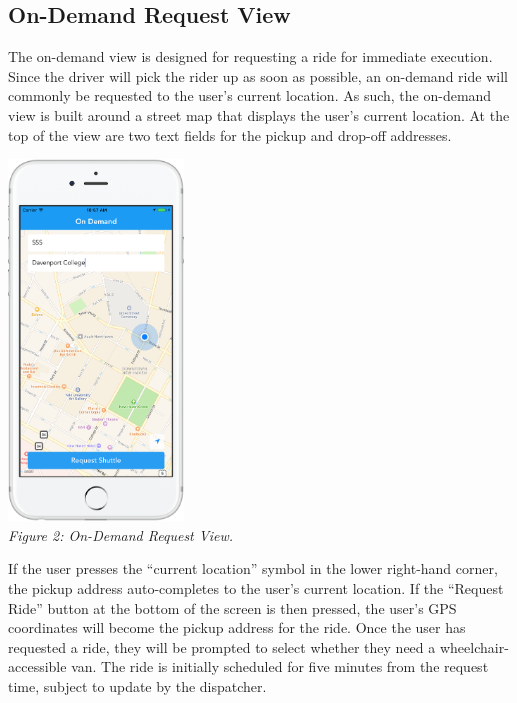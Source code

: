 \documentclass[12pt, a4paper]{article}
\begin{document}
\begin{multicols*}{2}
\subsection{On-Demand Request View}
The on-demand view is designed for requesting a ride for immediate execution. Since the driver will pick the rider up as soon as possible, an on-demand ride will commonly be requested to the user's current location. As such, the on-demand view is built around a street map that displays the user's current location. At the top of the view are two text fields for the pickup and drop-off addresses.
\begin{center}
	\includegraphics[keepaspectratio=true, width=0.35\textwidth]{screenshot-2.png}\\
	\textit{Figure 2: On-Demand Request View.}
\end{center}
If the user presses the ``current location'' symbol in the lower right-hand corner, the pickup address auto-completes to the user's current location. If the ``Request Ride'' button at the bottom of the screen is then pressed, the user's GPS coordinates will become the pickup address for the ride. Once the user has requested a ride, they will be prompted to select whether they need a wheelchair-accessible van. The ride is initially scheduled for five minutes from the request time, subject to update by the dispatcher.


\end{multicols*}
\end{document}
